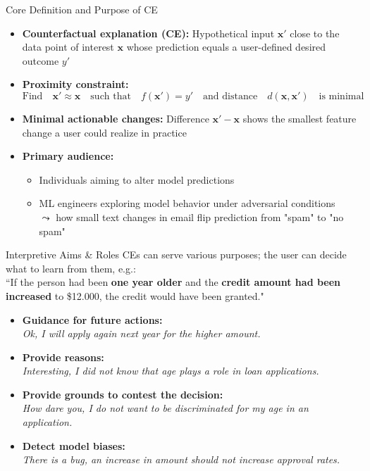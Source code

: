 \documentclass[11pt,compress,t,notes=noshow, aspectratio=169, xcolor=table, usenames,dvipsnames]{beamer}
\begin{document}
\begin{frame}{Core Definition and Purpose of CE}
  \begin{itemize}
    \item<1-> \textbf{Counterfactual explanation (CE):} Hypothetical input \(\mathbf{x}'\) close to the data point of interest $\mathbf{x}$ whose prediction equals a user-defined desired outcome \(y'\)
    \item<2-> \textbf{Proximity constraint:} %
      \[
      \text{Find} \quad \mathbf{x}' \approx \mathbf{x} \quad\text{such that} \quad f(\mathbf{x}') = y' \quad\text{and distance}\quad 
        d(\mathbf{x},\mathbf{x}') \quad \text{is minimal}
      \]
    \item<3-> \textbf{Minimal actionable changes:} Difference \(\mathbf{x}'-\mathbf{x}\) shows the smallest feature change a user could realize in practice
    \item<4-> \textbf{Primary audience:} 
    \begin{itemize}
        \item Individuals aiming to alter model predictions 
        \item ML engineers exploring model behavior under adversarial conditions\\
        $\leadsto$ how small text changes in email flip  prediction from "spam" to "no spam"
    \end{itemize}
  \end{itemize}
\end{frame}


\begin{frame}{Interpretive Aims \& Roles}
	CEs can serve various purposes; the user can decide what to learn from them, e.g.:  \\[0.2cm]
	``If the person had been \textbf{one year older} and the \textbf{credit amount had been increased} to \$12.000, the credit would have been granted."  \\[0.2cm]
	\pause
	\begin{itemize}[<+->]
		\itemsep1.2em
		\item \textbf{Guidance for future actions:}\\ \textit{Ok, I will apply again next year for the higher amount.}
		\item \textbf{Provide reasons:}\\ \textit{Interesting, I did not know that age plays a role in loan applications.}
		\item \textbf{Provide grounds to contest the decision:}\\ \textit{How dare you, I do not want to be discriminated for my age in an application.}
		\item \textbf{Detect model biases:}\\ \textit{There is a bug, an increase in amount should not increase approval rates.}
	\end{itemize}
\end{frame}
\end{document}
